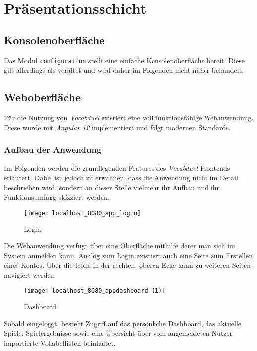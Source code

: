\section{Präsentationsschicht}\label{sec:praesentationsschicht}

\subsection{Konsolenoberfläche}

Das Modul \texttt{configuration} stellt eine einfache Konsolenoberfläche bereit.
Diese gilt allerdings als veraltet und wird daher im Folgenden nicht näher behandelt.

\subsection{Weboberfläche}

Für die Nutzung von \textit{Vocabduel} existiert eine voll funktionsfähige Webanwendung.
Diese wurde mit \textit{Angular 12} implementiert und folgt modernen Standards.

\subsubsection{Aufbau der Anwendung}

Im Folgenden werden die grundlegenden Features des \textit{Vocabduel}-Frontends erläutert.
Dabei ist jedoch zu erwähnen, dass die Anwendung nicht im Detail beschrieben wird, sondern
an dieser Stelle vielmehr ihr Aufbau und ihr Funktionsumfang skizziert werden.

\begin{figure}[H]
    \centering
    \texttt{[image: localhost\_8080\_app\_login]}
    \caption[]{Login}
    \label{fig:felogin}
\end{figure}

Die Webanwendung verfügt über eine Oberfläche mithilfe derer man sich im System anmelden kann.
Analog zum Login existiert auch eine Seite zum Erstellen eines Kontos.
Über die Icons in der rechten, oberen Ecke kann zu weiteren Seiten navigiert werden.

\begin{figure}[H]
    \centering
    \texttt{[image: localhost\_8080\_appdashboard (1)]}
    \caption[]{Dashboard}
    \label{fig:fedashboard}
\end{figure}

Sobald eingeloggt, besteht Zugriff auf das persönliche Dashboard, das aktuelle Spiele, Spielergebnisse sowie eine Übersicht
über vom angemeldeten Nutzer importierte Vokabellisten beinhaltet.

